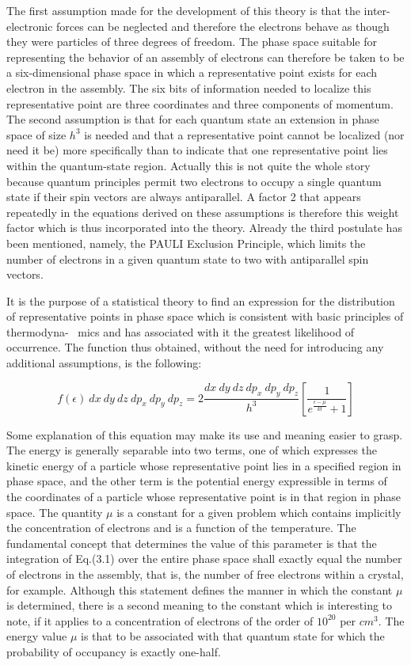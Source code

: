 \documentclass[11pt,a4paper]{article}
\begin{document}
	The first assumption made for the development of this theory is that the inter-electronic forces can be neglected and therefore the electrons behave as though they were particles of three degrees of freedom.
	The phase space suitable for representing the behavior of an assembly of electrons
	can therefore be taken to be a six-dimensional phase space in which a representative point exists for each electron in the assembly. The six bits of information
	needed to localize this representative point are three coordinates and three
	components of momentum. The second assumption is that for each quantum
	state an extension in phase space of size $h^3$ is needed and that a representative
	point cannot be localized (nor need it be) more specifically than to indicate
	that one representative point lies within the quantum-state region. Actually
	this is not quite the whole story because quantum principles permit two electrons
	to occupy a single quantum state if their spin vectors are always antiparallel.
	A factor 2 that appears repeatedly in the equations derived on these assumptions
	is therefore this weight factor which is thus incorporated into the theory.
	Already the third postulate has been mentioned, namely, the PAULI Exclusion
	Principle, which limits the number of electrons in a given quantum state to two
	with antiparallel spin vectors.
	
	It is the purpose of a statistical theory to find an expression for the distribution of representative points in phase space which is consistent with basic principles of thermodyna- \ mics and has associated with it the greatest likelihood of
	occurrence. The function thus obtained, without the need for introducing any
	additional assumptions, is the following:
	
	\begin{equation}
		f( \epsilon ) ~ dx~dy~dz~dp_x ~ dp_y ~ dp_z = 2 \frac{dx ~ dy ~ dz ~ dp_x  ~ dp_y ~ dp_z}{h^3} [ \frac{1}{e^\frac{\epsilon - \mu}{kt} + 1}]
	\end{equation}
	
	Some explanation of this equation may make its use and meaning easier to grasp.
	The energy is generally separable into two terms, one of which expresses the
	kinetic energy of a particle whose representative point lies in a specified region
	in phase space, and the other term is the potential energy expressible in terms of
	the coordinates of a particle whose representative point is in that region in phase
	space. The quantity $\mu$ is a constant for a given problem which contains implicitly
	the concentration of electrons and is a function of the temperature. The fundamental concept that determines the value of this parameter is that the integration
	of Eq.(3.1) over the entire phase space shall exactly equal the number of electrons in the assembly, that is, the number of free electrons within a crystal, for
	example. Although this statement defines the manner in which the constant $\mu$ 
	is determined, there is a second meaning to the constant which is interesting to
	note, if it applies to a concentration of electrons of the order of $10^{20}$ per $cm^3$. The energy value $\mu$  is that to be associated with that quantum state for which
	the probability of occupancy is exactly one-half.
	
\end{document}
